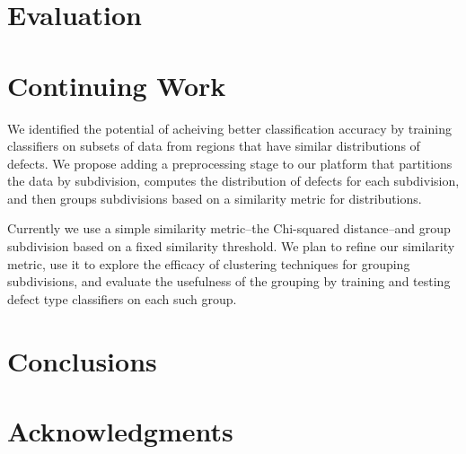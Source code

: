 \documentclass{sig-alternate-05-2015}
\begin{document}
\section{Evaluation}

\section{Continuing Work}
We identified the potential of acheiving better classification accuracy by training 
classifiers on subsets of data from regions that have similar distributions of defects.
We propose adding a preprocessing stage to our platform that partitions the data by 
subdivision, computes the distribution of defects for each subdivision, and then groups
subdivisions based on a similarity metric for distributions. 

Currently we use a simple similarity metric--the Chi-squared distance--and group subdivision
based on a fixed similarity threshold. We plan to refine our similarity metric, use it
to explore the efficacy of clustering techniques for grouping subdivisions, and evaluate the
usefulness of the grouping by training and testing defect type classifiers on each such group. 

\section{Conclusions}
\section{Acknowledgments}

%

%
%
\end{document}
